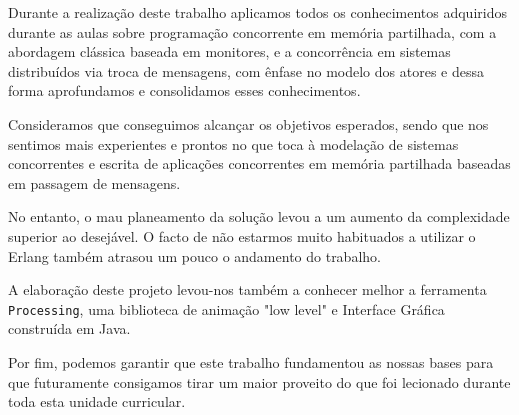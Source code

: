 \documentclass[11pt,a4paper]{report}
\begin{document}
    Durante a realização deste trabalho aplicamos todos os conhecimentos adquiridos durante as aulas sobre programação concorrente em memória partilhada, com a abordagem clássica baseada em monitores, e a concorrência em sistemas distribuídos via troca de mensagens, com ênfase no modelo dos atores e dessa forma aprofundamos e consolidamos esses conhecimentos. 
    
    Consideramos que conseguimos alcançar os objetivos esperados, sendo que nos sentimos mais experientes e prontos no que toca à modelação de sistemas concorrentes e escrita de aplicações concorrentes em memória partilhada baseadas em passagem de mensagens.
    
    No entanto, o mau planeamento da solução levou a um aumento da complexidade superior ao desejável. O facto de não estarmos muito habituados a utilizar o Erlang também atrasou um pouco o andamento do trabalho.
    
    A elaboração deste projeto levou-nos também a conhecer melhor a ferramenta \texttt{Processing}, uma biblioteca de animação "low level" e Interface Gráfica construída em Java. 
    
    Por fim, podemos garantir que este trabalho fundamentou as nossas bases para que futuramente consigamos tirar um maior proveito do que foi lecionado durante toda esta unidade curricular. 
\end{document}
